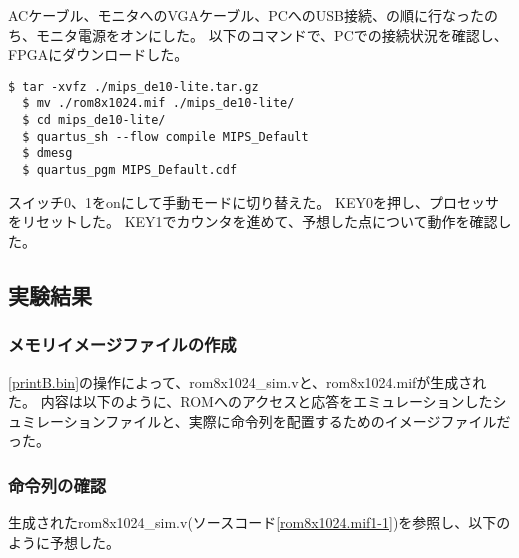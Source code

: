 ACケーブル、モニタへのVGAケーブル、PCへのUSB接続、の順に行なったのち、モニタ電源をオンにした。
以下のコマンドで、PCでの接続状況を確認し、FPGAにダウンロードした。
\begin{lstlisting}[caption={論理合成操作},label={論理合成操作1-1}]
  $ tar -xvfz ./mips_de10-lite.tar.gz
  $ mv ./rom8x1024.mif ./mips_de10-lite/
  $ cd mips_de10-lite/
  $ quartus_sh --flow compile MIPS_Default
  $ dmesg
  $ quartus_pgm MIPS_Default.cdf
\end{lstlisting}

スイッチ0、1をonにして手動モードに切り替えた。
KEY0を押し、プロセッサをリセットした。
KEY1でカウンタを進めて、予想した点について動作を確認した。

\subsection{実験結果}
\subsubsection{メモリイメージファイルの作成}
\ref{printB.bin}の操作によって、rom8x1024\_sim.vと、rom8x1024.mifが生成された。
内容は以下のように、ROMへのアクセスと応答をエミュレーションしたシュミレーションファイルと、実際に命令列を配置するためのイメージファイルだった。





\subsubsection{命令列の確認}
生成されたrom8x1024\_sim.v(ソースコード\ref{rom8x1024.mif1-1})を参照し、以下のように予想した。


